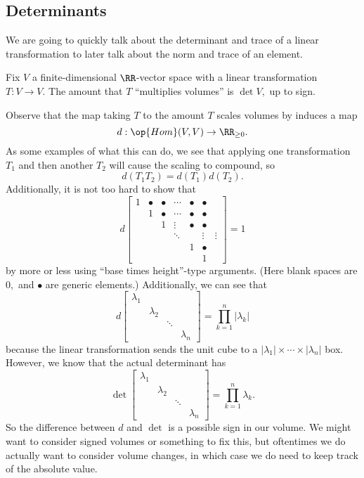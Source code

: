 \subsection{Determinants}
We are going to quickly talk about the determinant and trace of a linear transformation to later talk about the norm and trace of an element.
\begin{definition}
	Fix $V$ a finite-dimensional $\RR$-vector space with a linear transformation $T:V\to V.$ The amount that $T$ ``multiplies volumes'' is $\det V,$ up to sign.
\end{definition}
Observe that the map taking $T$ to the amount $T$ scales volumes by induces a map
\[d:\op{Hom}(V,V)\to\RR_{\ge0}.\]
As some examples of what this can do, we see that applying one transformation $T_1$ and then another $T_2$ will cause the scaling to compound, so
\[d(T_1T_2)=d(T_1)d(T_2).\]
Additionally, it is not too hard to show that
\[d\begin{bmatrix}
	1 & \bullet & \bullet & \cdots & \bullet & \bullet \\
	& 1 & \bullet & \cdots & \bullet & \bullet\\
	& & 1 & \vdots & \bullet & \bullet\\
	& &   & \ddots & & \vdots & \vdots \\
	&   &        &        & 1      & \bullet \\
	&   &        &        &        & 1
\end{bmatrix}=1 \tag{1}\label{eq:det1}\]
by more or less using ``base times height''-type arguments. (Here blank spaces are $0,$ and $\bullet$ are generic elements.) Additionally, we can see that
\[d\begin{bmatrix}
	\lambda_1 \\
	& \lambda_2 \\
	& & \ddots \\
	& & & \lambda_n
\end{bmatrix}=\prod_{k=1}^n|\lambda_k|\]
because the linear transformation sends the unit cube to a $|\lambda_1|\times\cdots\times|\lambda_n|$ box. However, we know that the actual determinant has
\[\det\begin{bmatrix}
	\lambda_1 \\
	& \lambda_2 \\
	& & \ddots \\
	& & & \lambda_n
\end{bmatrix}=\prod_{k=1}^n\lambda_k. \tag{2}\label{eq:det2}\]
So the difference between $d$ and $\det$ is a possible sign in our volume. We might want to consider signed volumes or something to fix this, but oftentimes we do actually want to consider volume changes, in which case we do need to keep track of the absolute value.
